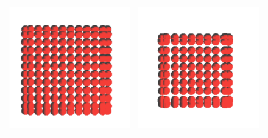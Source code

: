 \begin{figure}[htbp]
\begin{center}
\begin{tabular}{cc}
\includegraphics[scale= 0.5]{figures/coh1.pdf} &
\includegraphics[scale= 0.5]{figures/coh2.pdf} \\

\end{tabular}
\end{center}
\end{figure}
